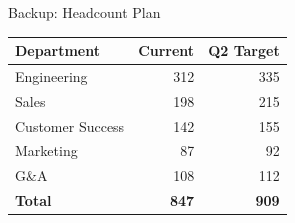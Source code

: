 \documentclass[aspectratio=169,11pt]{beamer}
\begin{document}
\begin{frame}{Backup: Headcount Plan}
    \centering
    \begin{tabular}{l r r}
        \toprule
        \textbf{Department} & \textbf{Current} & \textbf{Q2 Target} \\
        \midrule
        Engineering & 312 & 335 \\
        Sales & 198 & 215 \\
        Customer Success & 142 & 155 \\
        Marketing & 87 & 92 \\
        G\&A & 108 & 112 \\
        \midrule
        \textbf{Total} & \textbf{847} & \textbf{909} \\
        \bottomrule
    \end{tabular}
\end{frame}
\end{document}
